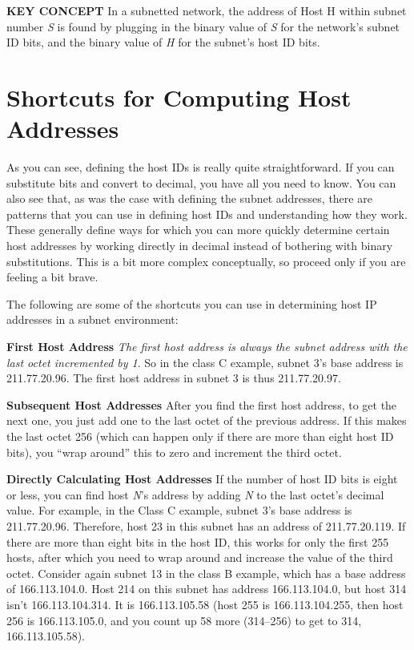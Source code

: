 {\textbf{KEY CONCEPT}} In a subnetted network, the address of Host H
within subnet number {\emph{S}} is found by plugging in the binary value
of {\emph{S}} for the network's subnet ID bits, and the binary value of
{\emph{H}} for the subnet's host ID bits.

\section{Shortcuts for Computing Host Addresses}

  As
you can see, defining the host IDs is really quite straightforward. If
you can substitute bits and convert to decimal, you have all you need to
know. You can also see that, as was the case with defining the subnet
addresses, there are patterns that you can use in defining host IDs and
understanding how they work. These generally define ways for which you
can more quickly determine certain host addresses by working directly in
decimal instead of bothering with binary substitutions. This is a bit
more complex conceptually, so proceed only if you are feeling a bit
brave.

The following are some of the shortcuts you can use in determining host
IP addresses in a subnet environment:

{\textbf{First Host Address}} {\emph{The first host address is always
the subnet address with the last octet incremented by 1}}. So in the
class C example, subnet 3's base address is 211.77.20.96. The first host
address in subnet 3 is thus 211.77.20.97.

{\textbf{Subsequent Host Addresses}} After you find the first host
address, to get the next one, you just add one to the last octet of the
previous address. If this makes the last octet 256 (which can happen
only if there are more than eight host ID bits), you ``wrap around'' this
to zero and increment the third octet.

{\textbf{Directly Calculating Host Addresses}} If the number of host ID
bits is eight or less, you can find host {\emph{N}}'s address by adding
{\emph{N}} to the last octet's decimal value. For example, in the Class
C example, subnet 3's base address is 211.77.20.96. Therefore, host 23
in this subnet has an address of 211.77.20.119. If there are more than
eight bits in the host ID, this works for only the first 255 hosts,
after which you need to wrap around and increase the value of the third
octet. Consider again subnet 13 in the class B example, which has a base
address of 166.113.104.0. Host 214 on this subnet has address
166.113.104.0, but host 314 isn't 166.113.104.314. It is 166.113.105.58
(host 255 is 166.113.104.255, then host 256 is 166.113.105.0, and you
count up 58 more (314--256) to get to 314, 166.113.105.58).

